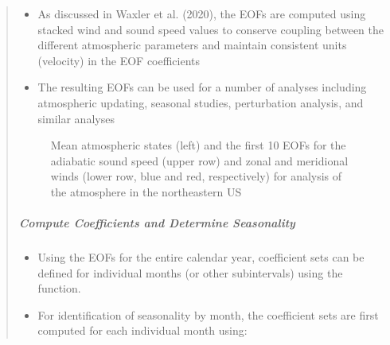 \documentclass[letterpaper,10pt,english]{sphinxmanual}
\let\sphinxpxdimen\pdfpxdimen\else\newdimen\sphinxpxdimen
\begin{document}
\begin{itemize}
\begin{quote}
\begin{itemize}
\item {} 
\sphinxAtStartPar
As discussed in Waxler et al. (2020), the EOFs are computed using stacked wind and sound speed values to conserve coupling between the different atmospheric parameters and maintain consistent units (velocity) in the EOF coefficients

\item {} 
\sphinxAtStartPar
The resulting EOFs can be used for a number of analyses including atmospheric updating, seasonal studies, perturbation analysis, and similar analyses

\end{itemize}

\begin{figure}[htbp]
\centering
\capstart

\noindent\sphinxincludegraphics[width=1000\sphinxpxdimen]{{US_NE-eofs}.png}
\caption{Mean atmospheric states (left) and the first 10 EOFs for the adiabatic sound speed (upper row) and zonal and meridional winds (lower row, blue and red, respectively) for analysis of the atmosphere in the northeastern US}\label{\detokenize{eofs:id1}}\end{figure}


\subparagraph{Compute Coefficients and Determine Seasonality}
\label{\detokenize{eofs:compute-coefficients-and-determine-seasonality}}\begin{itemize}
\item {} 
\sphinxAtStartPar
Using the EOFs for the entire calendar year, coefficient sets can be defined for individual months (or other sub\sphinxhyphen{}intervals) using the  function.

\item {} 
\sphinxAtStartPar
For identification of seasonality by month, the coefficient sets are first computed for each individual month using:

\end{itemize}


\end{quote}
\end{itemize}
\end{document}

